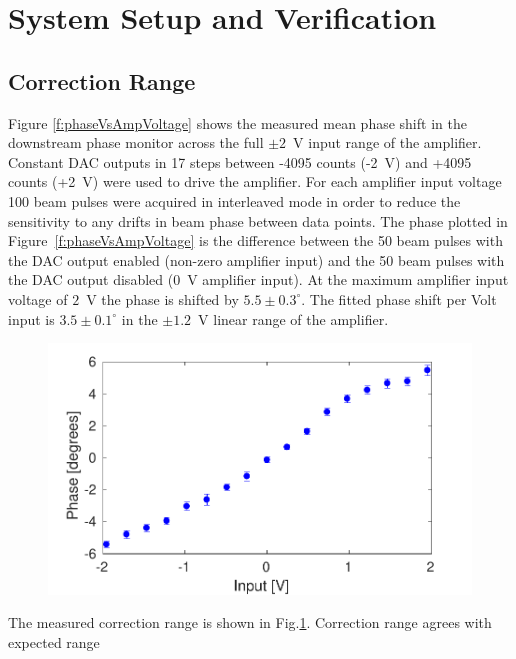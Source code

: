 \documentclass[%
 reprint,
 superscriptaddress,
 amsmath,
 amssymb,
 prstab,
]{revtex4-1}
\begin{document}
\section{\label{s:verify}System Setup and Verification}

\subsection{\label{ss:corrRange}Correction Range}

Figure \ref{f:phaseVsAmpVoltage} shows the measured mean phase shift in the 
downstream phase monitor across the full \(\pm2\)~V input range of the 
amplifier. Constant DAC outputs in 17 steps between -4095 counts (-2~V) and 
+4095 counts (+2~V) were used to drive the amplifier. For each amplifier input 
voltage 100 beam pulses were acquired in interleaved mode in order to reduce 
the sensitivity to any drifts in beam phase between data points. The phase 
plotted in Figure~\ref{f:phaseVsAmpVoltage} is the difference between the 50 
beam pulses with the DAC output enabled (non-zero amplifier input) and the 50 
beam pulses with the DAC output disabled (0~V amplifier input).
At the maximum amplifier input voltage of \(2\)~V the phase is shifted by 
\(5.5\pm0.3^\circ\). The fitted phase shift per Volt input is 
\(3.5\pm0.1^\circ\) in the \(\pm1.2\)~V linear range of the amplifier.

\begin{figure}
	\includegraphics[width=\columnwidth]{figs/optics/corrRange} 
	\caption{\label{f:corrRange}
	}
\end{figure}

The measured correction range is shown in Fig.\ref{f:corrRange}.
Correction range agrees with expected range
\end{document}
